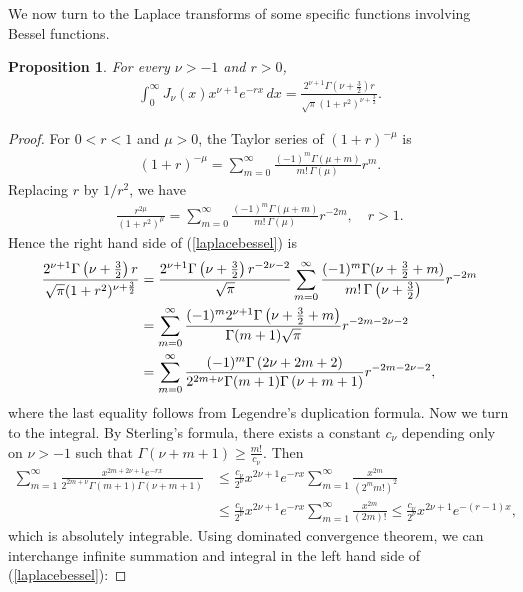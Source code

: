 \documentclass{article}
\numberwithin{equation}{section}
\theoremstyle{plain}
\newtheorem{proposition}[theorem]{Proposition}
\theoremstyle{definition}
\begin{document}
We now turn to the Laplace transforms of some specific functions involving Bessel functions.
\begin{proposition}\label{laptransbessel}
For every $\nu>-1$ and $r>0$,
\begin{align}
	\int_0^\infty J_\nu(x)x^{\nu+1}e^{-rx}\,dx=\frac{2^{\nu+1}\Gamma\left(\nu+\frac{3}{2}\right)r}{\sqrt{\pi}(1+r^2)^{\nu+\frac{3}{2}}}.\label{laplacebessel}
\end{align}
\end{proposition}
\begin{proof}
For $0<r<1$ and $\mu>0$, the Taylor series of $(1+r)^{-\mu}$ is
\begin{align*}
(1+r)^{-\mu}=\sum_{m=0}^\infty\frac{(-1)^m\Gamma(\mu+m)}{m!\,\Gamma(\mu)}r^m.
\end{align*}
Replacing $r$ by $1/r^2$, we have
\begin{align*}
\frac{r^{2\mu}}{(1+r^2)^\mu}=\sum_{m=0}^\infty\frac{(-1)^m\Gamma(\mu+m)}{m!\,\Gamma(\mu)}r^{-2m},\quad r>1.
\end{align*}
Hence the right hand side of (\ref{laplacebessel}) is
\begin{align}
	\frac{2^{\nu+1}\Gamma\left(\nu+\frac{3}{2}\right)r}{\sqrt{\pi}(1+r^2)^{\nu+\frac{3}{2}}}&=\frac{2^{\nu+1}\Gamma\left(\nu+\frac{3}{2}\right)r^{-2\nu-2}}{\sqrt{\pi}}\sum_{m=0}^\infty\frac{(-1)^m\Gamma(\nu+\frac{3}{2}+m)}{m!\,\Gamma\left(\nu+\frac{3}{2}\right)}r^{-2m}\notag\\
	&=\sum_{m=0}^\infty\frac{(-1)^m2^{\nu+1}\Gamma\left(\nu+\frac{3}{2}+m\right)}{\Gamma(m+1)\sqrt{\pi}}r^{-2m-2\nu-2}\notag\\
	&=\sum_{m=0}^\infty\frac{(-1)^m\Gamma\left(2\nu+2m+2\right)}{2^{2m+\nu}\Gamma(m+1)\Gamma\left(\nu+m+1\right)}r^{-2m-2\nu-2},\label{legendrebessel}
\end{align}
where the last equality follows from Legendre's duplication formula. Now we turn to the integral. By Sterling's formula, there exists a constant $c_\nu$ depending only on $\nu>-1$ such that $\Gamma\left(\nu+m+1\right)\geq\frac{m!}{c_\nu}$. Then
\begin{align*}
	\sum_{m=1}^\infty \frac{x^{2m+2\nu+1}e^{-rx}}{2^{2m+\nu}\Gamma(m+1)\Gamma\left(\nu+m+1\right)}&\leq \frac{c_\nu}{2^\nu} x^{2\nu+1}e^{-rx}\sum_{m=1}^\infty\frac{x^{2m}}{(2^mm!)^2}\\
	&\leq \frac{c_\nu}{2^\nu} x^{2\nu+1}e^{-rx}\sum_{m=1}^\infty\frac{x^{2m}}{(2m)!}\leq \frac{c_\nu}{2^\nu} x^{2\nu+1}e^{-(r-1)x},
\end{align*}
which is absolutely integrable. Using dominated convergence theorem, we can interchange infinite summation and integral in the left hand side of (\ref{laplacebessel}):

\end{proof}
\end{document}
